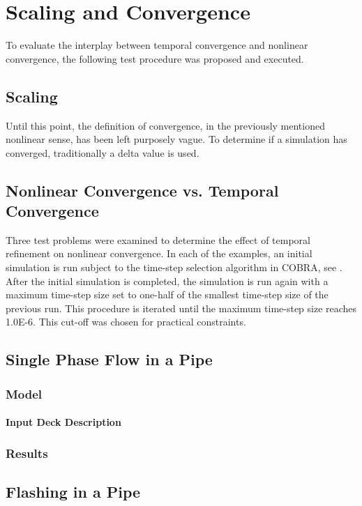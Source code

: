 \chapter{Scaling and Convergence}
\label{chap:scaling_and_convergence}
To evaluate the interplay between temporal convergence and nonlinear convergence, the following test procedure was proposed and executed.

\section{Scaling}
\label{sect:scaling}
Until this point, the definition of convergence, in the previously mentioned nonlinear sense, has been left purposely vague.
To determine if a simulation has converged, traditionally a delta value is used.



\section{Nonlinear Convergence vs. Temporal Convergence}
\label{sect:nonlinear_temporal_convergence}

Three test problems were examined to determine the effect of temporal refinement on nonlinear convergence.
In each of the examples, an initial simulation is run subject to the time-step selection algorithm in COBRA, see .
After the initial simulation is completed, the simulation is run again with a maximum time-step size set to one-half of the smallest time-step size of the previous run.
This procedure is iterated until the maximum time-step size reaches 1.0E-6.
This cut-off was chosen for practical constraints.

\section{Single Phase Flow in a Pipe}
\subsection{Model}
\subsubsection{Input Deck Description}
\subsection{Results}

\section{Flashing in a Pipe}
